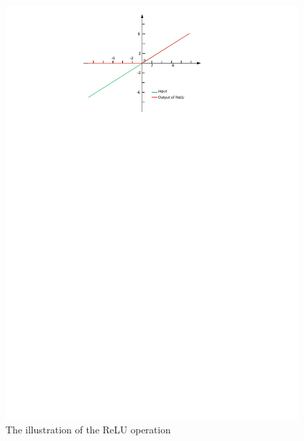 \begin{figure}
	\includegraphics[trim=2cm 22cm 0cm 1cm]{fig01/relu.pdf}
	\caption{The illustration of the ReLU operation}
	\label{fig:relu}
\end{figure}

